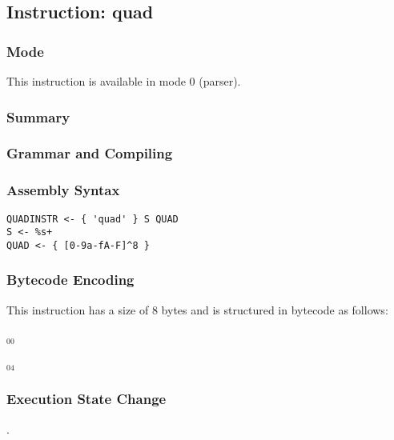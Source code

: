 \subsection{Instruction: quad}

\subsubsection{Mode}
This instruction is available in mode 0 (parser).
\subsubsection{Summary}


\subsubsection{Grammar and Compiling}


\subsubsection{Assembly Syntax}

\begin{myquote}
\begin{verbatim}
QUADINSTR <- { 'quad' } S QUAD
S <- %s+
QUAD <- { [0-9a-fA-F]^8 }
\end{verbatim}
\end{myquote}

\subsubsection{Bytecode Encoding}

This instruction has a size of 8 bytes and is structured in bytecode as follows:

$_{00}$\ 



$_{04}$\ 

\subsubsection{Execution State Change}

.


